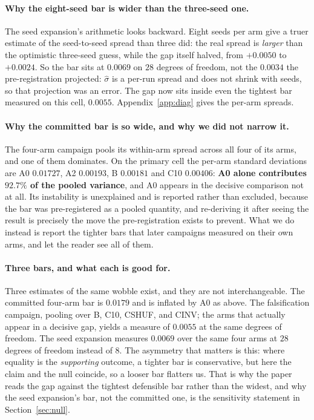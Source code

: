 \documentclass{article}
\begin{document}
\paragraph{Why the eight-seed bar is wider than the three-seed one.} The seed expansion's arithmetic looks backward. Eight seeds per arm give a truer estimate of the seed-to-seed spread
than three did: the real spread is \emph{larger} than the optimistic three-seed guess, while the gap
itself halved, from $+0.0050$ to $+0.0024$. So the bar sits at $0.0069$ on $28$ degrees of freedom,
not the $0.0034$ the pre-registration projected: $\hat{\sigma}$ is a per-run spread and does not
shrink with seeds, so that projection was an error. The gap now sits inside even the tightest bar
measured on this cell, $0.0055$. Appendix~\ref{app:diag} gives the per-arm spreads.




\paragraph{Why the committed bar is so wide, and why we did not narrow it.} The four-arm campaign
pools its within-arm spread across all four of its arms, and one of them dominates. On the primary
cell the per-arm standard deviations are A0 $0.01727$, A2 $0.00193$, B $0.00181$ and C10 $0.00406$:
\textbf{A0 alone contributes $92.7\%$ of the pooled variance}, and A0 appears in the decisive
comparison not at all. Its instability is unexplained and is reported rather than excluded, because
the bar was pre-registered as a pooled quantity, and re-deriving it after seeing the result is
precisely the move the pre-registration exists to prevent. What we do instead is report the tighter
bars that later campaigns measured on their own arms, and let the reader see all of them.

\paragraph{Three bars, and what each is good for.} Three estimates of the same wobble exist,
and they are not interchangeable. The committed four-arm bar is $0.0179$ and is inflated by A0 as
above. The falsification campaign, pooling over B, C10, CSHUF, and CINV; the arms that actually appear in a decisive gap, yields a measure of $0.0055$ at the same degrees of freedom. The seed expansion
measures $0.0069$ over the same four arms at $28$ degrees of freedom instead of $8$. The asymmetry
that matters is this: where equality is the \emph{supporting} outcome, a tighter bar is
conservative, but here the claim and the null coincide, so a looser bar flatters us. That is why the
paper reads the gap against the tightest defensible bar rather than the widest, and why the seed
expansion's bar, not the committed one, is the sensitivity statement in Section~\ref{sec:null}.
\end{document}
